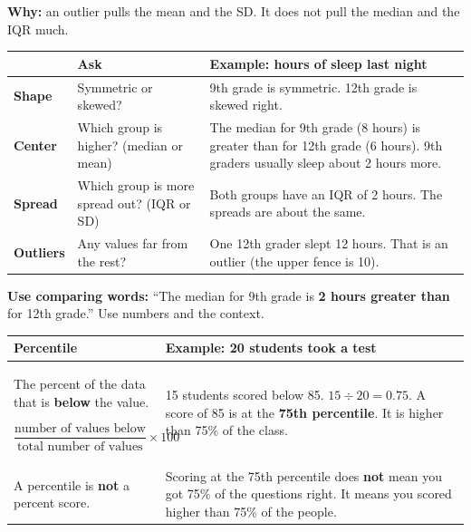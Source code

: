 \documentclass[11pt]{article}
\newcommand{\sumhead}[1]{\par\vspace{0.35em}{\large\bfseries #1}\par\vspace{0.15em}}
\newcommand{\tall}{\rule[-0.85em]{0pt}{2.2em}}
\begin{document}
\vspace{0.3em}
\textbf{Why:} an outlier pulls the mean and the SD. It does not pull the median and the IQR much.

\sumhead{Comparing Two Distributions}
\begin{tabular}{|L{0.85in}|L{2.05in}|L{3.55in}|}\hline
 & \textbf{Ask} & \textbf{Example: hours of sleep last night}\\ \hline
\textbf{Shape} & Symmetric or skewed? & 9th grade is symmetric. 12th grade is skewed right.\\ \hline
\textbf{Center} & Which group is higher? (median or mean) & The median for 9th grade (8 hours) is greater than for 12th grade (6 hours). 9th graders usually sleep about 2 hours more.\\ \hline
\textbf{Spread} & Which group is more spread out? (IQR or SD) & Both groups have an IQR of 2 hours. The spreads are about the same.\\ \hline
\textbf{Outliers} & Any values far from the rest? & One 12th grader slept 12 hours. That is an outlier (the upper fence is 10).\\ \hline
\end{tabular}

\vspace{0.3em}
\textbf{Use comparing words:} ``The median for 9th grade is \textbf{2 hours greater than} for 12th grade.'' Use numbers and the context.

\sumhead{Percentiles}
\begin{tabular}{|L{3.25in}|L{3.4in}|}\hline
\textbf{Percentile} & \textbf{Example: 20 students took a test}\\ \hline
The percent of the data that is \textbf{below} the value.\newline
\tall$\dfrac{\text{number of values below}}{\text{total number of values}} \times 100$ &
15 students scored below 85. $15 \div 20 = 0.75$. A score of 85 is at the \textbf{75th percentile}. It is higher than 75\% of the class.\\ \hline
A percentile is \textbf{not} a percent score. &
Scoring at the 75th percentile does \textbf{not} mean you got 75\% of the questions right. It means you scored higher than 75\% of the people.\\ \hline
\end{tabular}
\end{document}
